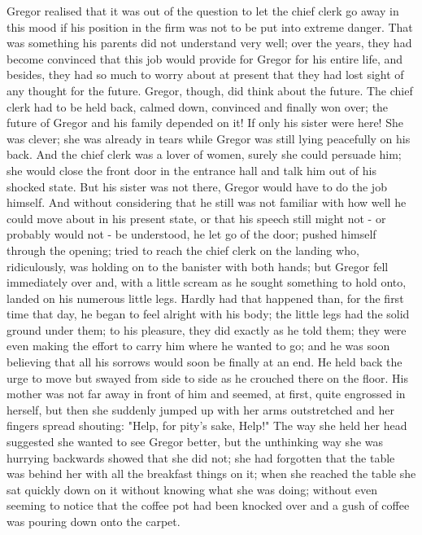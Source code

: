 \documentclass[12pt]{book}
\begin{document}
    Gregor realised that it was out of the question to let the chief clerk go away in this mood if his position in the firm was not to be put into extreme danger. That was something his parents did not understand very well; over the years, they had become convinced that this job would provide for Gregor for his entire life, and besides, they had so much to worry about at present that they had lost sight of any thought for the future. Gregor, though, did think about the future. The chief clerk had to be held back, calmed down, convinced and finally won over; the future of Gregor and his family depended on it! If only his sister were here! She was clever; she was already in tears while Gregor was still lying peacefully on his back. And the chief clerk was a lover of women, surely she could persuade him; she would close the front door in the entrance hall and talk him out of his shocked state. But his sister was not there, Gregor would have to do the job himself. And without considering that he still was not familiar with how well he could move about in his present state, or that his speech still might not - or probably would not - be understood, he let go of the door; pushed himself through the opening; tried to reach the chief clerk on the landing who, ridiculously, was holding on to the banister with both hands; but Gregor fell immediately over and, with a little scream as he sought something to hold onto, landed on his numerous little legs. Hardly had that happened than, for the first time that day, he began to feel alright with his body; the little legs had the solid ground under them; to his pleasure, they did exactly as he told them; they were even making the effort to carry him where he wanted to go; and he was soon believing that all his sorrows would soon be finally at an end. He held back the urge to move but swayed from side to side as he crouched there on the floor. His mother was not far away in front of him and seemed, at first, quite engrossed in herself, but then she suddenly jumped up with her arms outstretched and her fingers spread shouting: "Help, for pity's sake, Help!" The way she held her head suggested she wanted to see Gregor better, but the unthinking way she was hurrying backwards showed that she did not; she had forgotten that the table was behind her with all the breakfast things on it; when she reached the table she sat quickly down on it without knowing what she was doing; without even seeming to notice that the coffee pot had been knocked over and a gush of coffee was pouring down onto the carpet.
\end{document}

